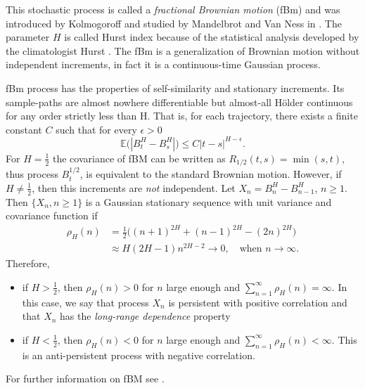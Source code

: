 \documentclass[smallextended]{svjour3}
\newcommand{\E}{\mathbb{E}}
\begin{document}
        This stochastic process is called a \emph{fractional Brownian motion}
    (fBm) and was introduced by Kolmogoroff \cite{ko} and studied by Mandelbrot
    and Van Ness in \cite{ma-va}. The parameter $H$ is called Hurst index
    because of the statistical analysis developed by the climatologist Hurst
    \cite{hu}. The fBm is a generalization of Brownian motion without
    independent increments, in fact it is a continuous-time Gaussian process.


        fBm process has the properties of self-similarity and stationary 
    increments. Its sample-paths are almost nowhere differentiable but 
    almost-all H\"{o}lder continuous 
    for any order strictly less than H. That is, for each
    trajectory, there exists a finite constant $C$ such that for every
    $\epsilon > 0$
    \[
        \E \big(
            | B_t ^ H - B_s ^ H|
        \big)
        \le
        C |t - s| ^ {H - \epsilon} .
    \]
%
        For $H = \tfrac{1}{2} $ the covariance of fBM can be written as
    $
        R_{1 / 2} (t, s)
            = \min(s, t)
    $, thus process $B_t ^ {1 / 2}$, is equivalent to
    the standard Brownian motion. However, if $H \ne \tfrac{1}{2}$, 
    then this increments are \emph{not} independent.
%
    	Let  $X_n = B_n ^ H - B_{n - 1} ^ H$, $n \ge 1$.
    Then $\{X_n, n \ge 1\}$ is a Gaussian stationary sequence with unit
    variance and covariance function if
    \begin{align*}
        \rho_H (n) &=
            \frac{1}{2}
            \Big(
                (n + 1) ^ {2 H} + (n - 1) ^ {2 H}
                - (2 n) ^{2 H}
            \Big)
            \\
            &\approx
            H (2H - 1)n^{2H-2} \to 0, \quad \text{when }
        n \to \infty.
    \end{align*}
    Therefore,
    \begin{itemize}
        \item
        if $H > \tfrac{1}{2}$, then $\rho_H(n) > 0$ for $n$ large enough and
        $\sum_{n=1}^\infty \rho_H(n)=\infty$. In this case, we say that
        process $X_n$ is persistent with positive correlation and that
        $X_n$ has the \emph{ long-range dependence} property
        \item
        if $H < \tfrac{1}{2}$, then $\rho_H(n) < 0$ for $n$ large enough and
        $\sum_{n=1}^\infty \rho_H(n)<\infty$.
        This is an anti-persistent process with negative correlation.
    \end{itemize}
    For further information on fBM see \cite{ra,nu,mi}.
\end{document}
